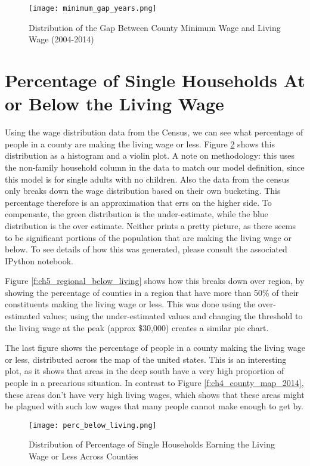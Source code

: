 \begin{figure}[H]
    \centering
        \texttt{[image: minimum\_gap\_years.png]}
        \caption{Distribution of the Gap Between County Minimum Wage and Living Wage (2004-2014)}
    \label{f:ch5_minimum_gap_years}
\end{figure}


\section{Percentage of Single Households At or Below the Living Wage}

Using the wage distribution data from the Census, we can see what percentage of people in a county are making the living wage or less. Figure \ref{f:ch5_perc_below_living} shows this distribution as a histogram and a violin plot. A note on methodology: this uses the non-family household column in the data to match our model definition, since this model is for single adults with no children. Also the data from the census only breaks down the wage distribution based on their own bucketing. This percentage therefore is an approximation that errs on the higher side. To compensate, the green distribution is the under-estimate, while the blue distribution is the over estimate. Neither prints a pretty picture, as there seems to be significant portions of the population that are making the living wage or below. To see details of how this was generated, please consult the associated IPython notebook.

Figure \ref{f:ch5_regional_below_living} shows how this breaks down over region, by showing the percentage of counties in a region that have more than 50\% of their constituents making the living wage or less. This was done using the over-estimated values; using the under-estimated values and changing the threshold to the living wage at the peak (approx \$30,000) creates a similar pie chart.

The last figure shows the percentage of people in a county making the living wage or less, distributed across the map of the united states. This is an interesting plot, as it shows that areas in the deep south have a very high proportion of people in a precarious situation. In contrast to Figure \ref{f:ch4_county_map_2014}, these areas don't have very high living wages, which shows that these areas might be plagued with such low wages that many people cannot make enough to get by.

\begin{figure}[H]
    \centering
        \texttt{[image: perc\_below\_living.png]}
        \caption{Distribution of Percentage of Single Households Earning the Living Wage or Less Across Counties}
    \label{f:ch5_perc_below_living}
\end{figure}

